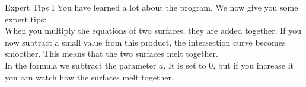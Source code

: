 \begin{surferPage}{Expert Tips I}
You have learned a lot about the program. We now give you some expert tips:\\
\vspace{0.3cm}
When you multiply the equations of two surfaces, they are added together. If you now subtract a small value from this product, the intersection curve becomes smoother. This means that the two surfaces melt together.\\
\vspace{0.3cm}
In the formula we subtract the parameter $a$. It is set to 0, but if you increase it you can watch how the surfaces melt together.
\end{surferPage}
